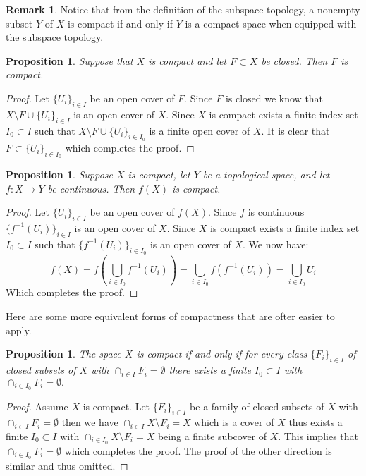 \documentclass[11pt,a4paper]{article}
\theoremstyle{definition}
\newtheorem{remark}{Remark}[section]
\theoremstyle{plain}
\newtheorem{proposition}[theorem]{Proposition}
\begin{document}
  \begin{remark}
    Notice that from the definition of the subspace topology,
    a nonempty subset $Y$ of $X$ is compact if and only if $Y$ is a 
    compact space when equipped with the subspace topology.
  \end{remark}

  \begin{proposition}
    Suppose that $X$ is compact and let $F \subset X$ be closed. Then
    $F$ is compact.
  \end{proposition}
  \begin{proof}
    Let $\{U_i\}_{i \in I}$ be an open cover of $F$. Since $F$ is closed
    we know that $X \setminus F \cup \{U_i\}_{i \in I}$ is an open cover
    of $X$. Since $X$ is compact exists a finite index set $I_0 \subset I$
    such that $X \setminus F \cup \{U_i\}_{i \in I_0}$ is a finite
    open cover of $X$. It is clear that $F \subset \{U_i\}_{i \in I_0}$
    which completes the proof.
  \end{proof}

  \begin{proposition}
    Suppose $X$ is compact, let $Y$ be a topological space, and let
    $f \colon X \to Y$ be continuous. Then $f(X)$ is compact.
  \end{proposition}
  \begin{proof}
    Let $\{U_i\}_{i \in I}$ be an open cover of $f(X)$. Since $f$
    is continuous $\{f^{-1}(U_i)\}_{i \in I}$ is an open cover of $X$.
    Since $X$ is compact exists a finite index set $I_0 \subset I$
    such that $\{f^{-1}(U_i)\}_{i \in I_0}$ is an open cover of $X$.
    We now have:
    \[
      f(X) = f\left(\bigcup_{i \in I_0} f^{-1}(U_i)\right) = 
      \bigcup_{i \in I_0} f(f^{-1}(U_i)) = 
      \bigcup_{i \in I_0} U_i
    \]
    Which completes the proof.
  \end{proof}

  Here are some more equivalent forms of compactness that are ofter easier
  to apply.

  \begin{proposition}\label{prp:fip}
    The space $X$ is compact if and only if for every class 
    $\{F_i\}_{i \in I}$ of closed subsets of $X$ with 
    $\cap_{i \in I}{F_i} = \emptyset$ there exists a finite 
    $I_0 \subset I$ with $\cap_{i \in I_0} {F_i} = \emptyset.$
  \end{proposition}
  \begin{proof}
    Assume $X$ is compact. Let $\{F_i\}_{i \in I}$ be a family of closed 
    subsets of $X$ with $\cap_{i \in I}{F_i} = \emptyset$ then 
    we have
    $\cap_{i \in I} {X \setminus F_i} = X$ which is a cover of $X$
    thus exists a finite $I_0 \subset I$ with 
    $\cap_{i \in I_0} {X \setminus F_i} = X$ being a finite subcover
    of $X$. This implies that $\cap_{i \in I_0} {F_i} = \emptyset$
    which completes the proof. The proof of the other direction is
    similar and thus omitted. 
  \end{proof}
\end{document}
